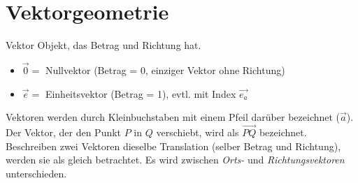 \graphicspath{{images/}}

\section{Vektorgeometrie}

\begin{definition}{Vektor}
    Objekt, das Betrag und Richtung hat.
    \begin{itemize}
        \item $\overrightarrow{0} = $ Nullvektor (Betrag = 0, einziger Vektor ohne Richtung)
        \item $\overrightarrow{e} = $ Einheitsvektor (Betrag = 1), evtl. mit Index $\vec{e_a}$
    \end{itemize}
    Vektoren werden durch Kleinbuchstaben mit einem Pfeil darüber bezeichnet ($\vec{a}$).
    Der Vektor, der den Punkt $P$ in $Q$ verschiebt, wird als $\vec{PQ}$ bezeichnet.
    Beschreiben zwei Vektoren dieselbe Translation (selber Betrag und Richtung),
    werden sie als gleich betrachtet.
    Es wird zwischen \textit{Orts-} und \textit{Richtungsvektoren} unterschieden.
\end{definition}

